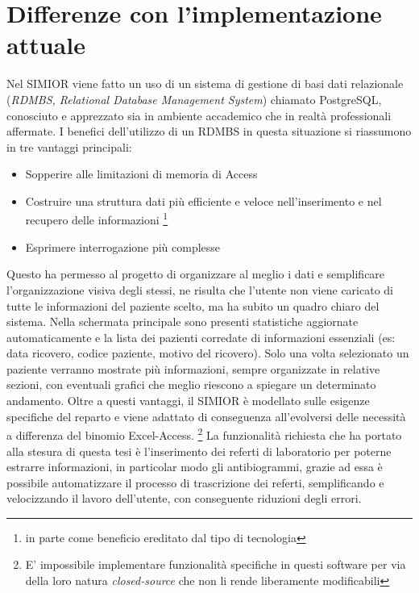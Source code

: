 \section{Differenze con l'implementazione attuale}
Nel SIMIOR viene fatto un uso di un sistema di gestione di basi dati relazionale (\textit{RDMBS, Relational Database Management System}) chiamato PostgreSQL, conosciuto e apprezzato sia in ambiente accademico che in realtà professionali affermate. I benefici dell'utilizzo di un RDMBS in questa situazione si riassumono in tre vantaggi principali:
\begin{itemize}
	\item Sopperire alle limitazioni di memoria di Access
	\item Costruire una struttura dati più efficiente e veloce nell'inserimento e nel recupero delle informazioni \footnote{in parte come beneficio ereditato dal tipo di tecnologia}
	\item Esprimere interrogazione più complesse
\end{itemize}
Questo ha permesso al progetto di organizzare al meglio i dati e semplificare l'organizzazione visiva degli stessi, ne risulta che l'utente non viene caricato di tutte le informazioni del paziente scelto, ma ha subito un quadro chiaro del sistema. Nella schermata principale sono presenti statistiche aggiornate automaticamente e la lista dei pazienti corredate di informazioni essenziali (es: data ricovero, codice paziente, motivo del ricovero). Solo una volta selezionato un paziente verranno mostrate più informazioni, sempre organizzate in relative sezioni, con eventuali grafici che meglio riescono a spiegare un determinato andamento.
Oltre a questi vantaggi, il SIMIOR è modellato sulle esigenze specifiche del reparto e viene adattato di conseguenza all'evolversi delle necessità a differenza del binomio Excel-Access. \footnote{E' impossibile implementare funzionalità specifiche in questi software per via della loro natura \textit{closed-source} che non li rende liberamente modificabili}
La funzionalità richiesta che ha portato alla stesura di questa tesi è l'inserimento dei referti di laboratorio per poterne estrarre informazioni, in particolar modo gli antibiogrammi, grazie ad essa è possibile automatizzare il processo di trascrizione dei referti, semplificando e velocizzando il lavoro dell'utente, con conseguente riduzioni degli errori.



%
%


